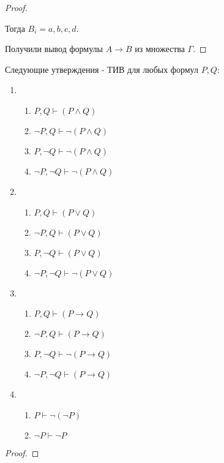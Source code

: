 \begin{lemma}[О дедукции (DT)]
\begin{proof}
\begin{enumerate}
                Тогда $B_{i} = a,b,c,d$.
        \end{enumerate}

        Получили вывод формулы $A \to B$ из множества $\Gamma$.
    \end{proof}
\end{lemma}
\begin{lemma} \label{logic_truth_table_base} \thmslashn

    Следующие утверждения - ТИВ для любых формул $P, Q$:

    \begin{enumerate}
        \item
            \begin{enumerate}
                \item $P, Q \vdash (P \land Q)$
                \item $\neg P, Q \vdash \neg (P \land Q)$
                \item $P, \neg Q \vdash \neg (P \land Q)$
                \item $\neg P, \neg Q \vdash \neg (P \land Q)$
            \end{enumerate}
        \item
            \begin{enumerate}
                \item $P, Q \vdash (P \lor Q)$
                \item $\neg P, Q \vdash (P \lor Q)$
                \item $P, \neg Q \vdash (P \lor Q)$
                \item $\neg P, \neg Q \vdash \neg (P \lor Q)$
            \end{enumerate}
        \item
            \begin{enumerate}
                \item $P, Q \vdash (P \to  Q)$
                \item $\neg P, Q \vdash (P \to  Q)$
                \item $P, \neg Q \vdash \neg (P \to Q)$
                \item $\neg P, \neg Q \vdash (P \to Q)$
            \end{enumerate}
        \item
            \begin{enumerate}
                \item $P \vdash \neg(\neg P)$
                \item  $\neg P \vdash \neg P$
            \end{enumerate}
    \end{enumerate}
    \begin{proof} \thmslashn
    
    \end{proof}
\end{lemma}
